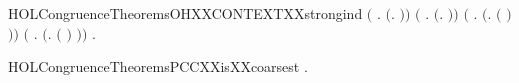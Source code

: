 \begin{SaveVerbatim}{HOLCongruenceTheoremsOHXXCONTEXTXXstrongind}
       \ensuremath{(}\HOLSymConst{\HOLTokenForall{}} .
              \HOLSymConst{\HOLTokenConj{}}   \HOLSymConst{\HOLTokenImp{}}
             \ensuremath{(}\HOLTokenLambda{}.   \HOLSymConst{\ensuremath{\mid}} \ensuremath{)}\ensuremath{)} \HOLSymConst{\HOLTokenConj{}}
       \ensuremath{(}\HOLSymConst{\HOLTokenForall{}} .
              \HOLSymConst{\HOLTokenConj{}}   \HOLSymConst{\HOLTokenImp{}}
             \ensuremath{(}\HOLTokenLambda{}.  \HOLSymConst{\ensuremath{\mid}}  \ensuremath{)}\ensuremath{)} \HOLSymConst{\HOLTokenConj{}}
       \ensuremath{(}\HOLSymConst{\HOLTokenForall{}} .
              \HOLSymConst{\HOLTokenConj{}}   \HOLSymConst{\HOLTokenImp{}}
             \ensuremath{(}\HOLTokenLambda{}.   \ensuremath{(} \ensuremath{)}\ensuremath{)}\ensuremath{)} \HOLSymConst{\HOLTokenConj{}}
       \ensuremath{(}\HOLSymConst{\HOLTokenForall{}} .
              \HOLSymConst{\HOLTokenConj{}}   \HOLSymConst{\HOLTokenImp{}}
             \ensuremath{(}\HOLTokenLambda{}.  \ensuremath{(} \ensuremath{)} \ensuremath{)}\ensuremath{)} \HOLSymConst{\HOLTokenImp{}}
       \HOLSymConst{\HOLTokenForall{}}.   \HOLSymConst{\HOLTokenImp{}}  
\end{SaveVerbatim}
\newcommand{\HOLCongruenceTheoremsOHXXCONTEXTXXstrongind}{\UseVerbatim{HOLCongruenceTheoremsOHXXCONTEXTXXstrongind}}
\begin{SaveVerbatim}{HOLCongruenceTheoremsPCCXXisXXcoarsest}
\HOLTokenTurnstile{} \HOLSymConst{\HOLTokenForall{}} .   \HOLSymConst{\HOLTokenConj{}}    \HOLSymConst{\HOLTokenImp{}}    
\end{SaveVerbatim}
